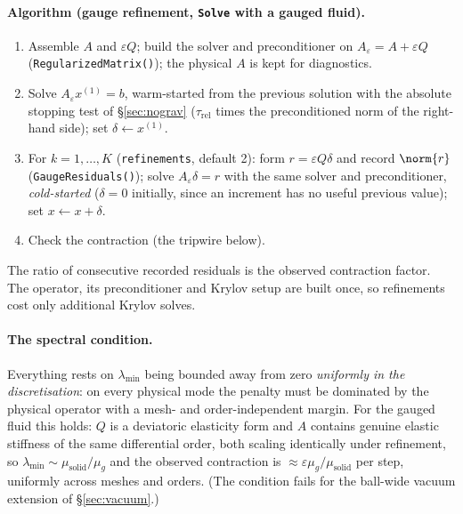 \documentclass[11pt]{article}
\numberwithin{equation}{section}
\theoremstyle{remark}
\newcommand{\eps}{\varepsilon}
\newcommand{\code}[1]{\texttt{#1}}
\begin{document}
\paragraph{Algorithm (gauge refinement, \code{Solve} with a gauged fluid).}
\begin{enumerate}
\item Assemble $A$ and $\eps Q$; build the solver and preconditioner on
  $A_\eps = A + \eps Q$ (\code{RegularizedMatrix()}); the physical $A$ is
  kept for diagnostics.
\item Solve $A_\eps x^{(1)} = b$, warm-started from the previous
  solution with the absolute stopping test of \S\ref{sec:nograv}
  ($\tau_{\mathrm{rel}}$ times the preconditioned norm of the
  right-hand side); set $\delta \leftarrow x^{(1)}$.
\item For $k = 1,\dots,K$ (\code{refinements}, default 2): form
  $r = \eps Q\delta$ and record $\norm{r}$ (\code{GaugeResiduals()}); solve
  $A_\eps\delta = r$ with the same solver and preconditioner,
  \emph{cold-started} ($\delta = 0$ initially, since an increment has no
  useful previous value); set $x\leftarrow x + \delta$.
\item Check the contraction (the tripwire below).
\end{enumerate}
The ratio of consecutive recorded residuals is the observed contraction
factor. The operator, its preconditioner and Krylov setup are built once,
so refinements cost only additional Krylov solves.

\paragraph{The spectral condition.} Everything rests on $\lambda_{\min}$
being bounded away from zero \emph{uniformly in the discretisation}: on
every physical mode the penalty must be dominated by the physical operator
with a mesh- and order-independent margin. For the gauged fluid this
holds: $Q$ is a deviatoric elasticity form and $A$ contains genuine elastic
stiffness of the same differential order, both scaling identically under
refinement, so $\lambda_{\min}\sim\mu_{\mathrm{solid}}/\mu_g$ and the
observed contraction is $\approx\eps\mu_g/\mu_{\mathrm{solid}}$ per step,
uniformly across meshes and orders. (The condition fails for the ball-wide
vacuum extension of \S\ref{sec:vacuum}.)
\end{document}
